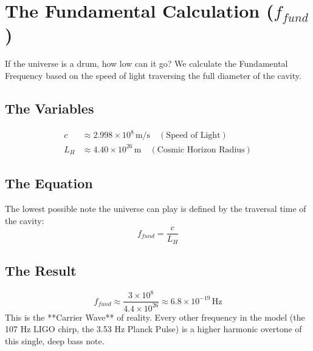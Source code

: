 \documentclass[11pt, letterpaper, openany]{book}
\begin{document}
\section{The Fundamental Calculation ($f_{fund}$)}
If the universe is a drum, how low can it go? We calculate the Fundamental Frequency based on the speed of light traversing the full diameter of the cavity.

\subsection{The Variables}
\begin{align}
    c &\approx 2.998 \times 10^8 \, \text{m/s} \quad (\text{Speed of Light}) \\
    L_H &\approx 4.40 \times 10^{26} \, \text{m} \quad (\text{Cosmic Horizon Radius})
\end{align}

\subsection{The Equation}
The lowest possible note the universe can play is defined by the traversal time of the cavity:
\begin{equation}
    f_{fund} = \frac{c}{L_H}
\end{equation}

\subsection{The Result}
\begin{equation}
    f_{fund} \approx \frac{3 \times 10^8}{4.4 \times 10^{26}} \approx 6.8 \times 10^{-19} \, \text{Hz}
\end{equation}
This is the **Carrier Wave** of reality. Every other frequency in the model (the 107 Hz LIGO chirp, the 3.53 Hz Planck Pulse) is a higher harmonic overtone of this single, deep bass note.
\end{document}
